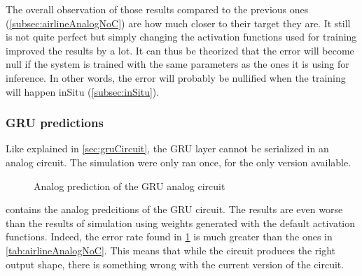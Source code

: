 The overall observation of those results compared to the previous ones (\cref{subsec:airlineAnalogNoC}) are how much closer to their target they are. It still is not quite perfect but simply changing the activation functions used for training improved the results by a lot. It can thus be theorized that the error will become null if the system is trained with the same parameters as the ones it is using for inference. In other words, the error will probably be nullified when the training will happen inSitu (\cref{subsec:inSitu}).

\subsubsection{\ac{GRU} predictions}

Like explained in \cref{sec:gruCircuit}, the \ac{GRU} layer cannot be serialized in an analog circuit. The simulation were only ran once, for the only version available.

\begin{figure}[H]
  \centering
  
  \caption{Analog prediction of the \ac{GRU} analog circuit}
  \label{graph:airlineAnalogGRU}
\end{figure}

 contains the analog predcitions of the \ac{GRU} circuit. The results are even worse than the results of simulation using weights generated with the default activation functions. Indeed, the error rate found in \cref{graph:airlineAnalogGRU} is much greater than the ones in \cref{tab:airlineAnalogNoC}. This means that while the circuit produces the right output shape, there is something wrong with the current version of the circuit.
